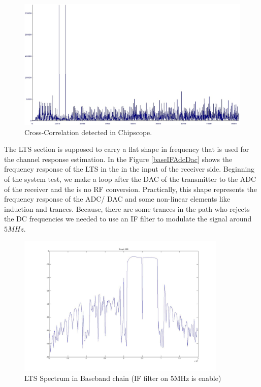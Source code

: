 \begin{figure}
\centering
\includegraphics[width=\textwidth]{content/fig/crosscorr.JPG}
\caption{Cross-Correlation detected in Chipscope.}
\label{fig:crosscorr}
\end{figure}

The LTS section is supposed to carry a flat shape in frequency that is used for the channel response estimation. In the Figure \ref{baseIFAdcDac} shows the frequency response of the LTS in the in the input of the receiver side. Beginning of the system test, we make a loop after the DAC of the transmitter to the ADC of the receiver and the is no RF conversion. Practically, this shape represents the frequency response of the ADC/ DAC and some non-linear elements like induction and trances. Because, there are some trances in the path who rejects the DC frequencies we needed to use an IF filter to modulate the signal around $5 MHz$.\\

\begin{figure}
\centering
\includegraphics[width=10cm]{content/fig/baseIFAdcDac.JPG}
\caption{LTS Spectrum in Baseband chain (IF filter on 5MHz is enable)}
\label{fig:baseIFAdcDac}
\end{figure}

